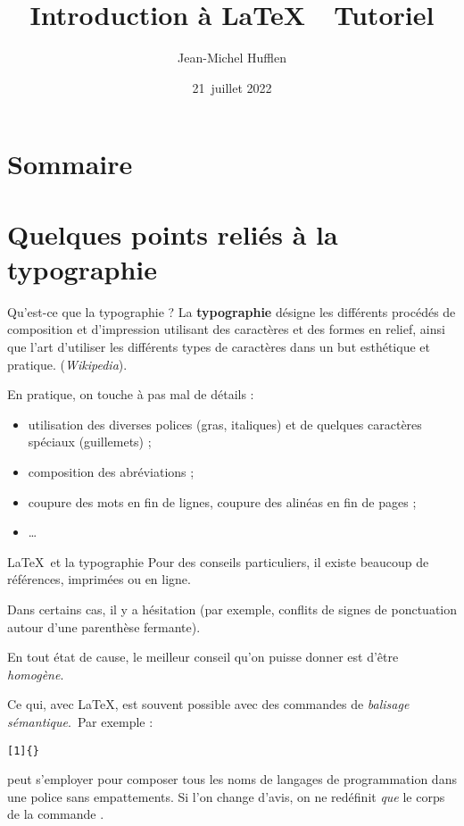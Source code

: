 \documentclass[pdf]{beamer}
\title{Introduction à \LaTeX\ \Dash\ Tutoriel}
\author{Jean-Michel Hufflen}
\date{21~juillet 2022}
\institute{TUG}
\begin{document}
\frame{\titlepage}

\section*{Sommaire}

\begin{frame}
\tableofcontents[]
\end{frame}

\section{Quelques points reliés à la typographie}

\begin{frame}{Qu'est-ce que la typographie ?}
La \textbf{typographie} désigne les différents procédés de composition et
d’impression utilisant des caractères et des formes en relief, ainsi que l’art
d’utiliser les différents types de caractères dans un but esthétique et
pratique. (\foreignlanguage{english}{\emph{Wikipedia}}).\pause

En pratique, on touche à pas mal de détails :\pause
\begin{itemize}
 \item utilisation des diverses polices (gras, italiques) et de quelques
caractères spéciaux (guillemets) ;\pause
 \item composition des abréviations ;\pause
 \item coupure des mots en fin de lignes, coupure des alinéas en fin de pages
;\pause
 \item \ldots
\end{itemize}
\end{frame}

\begin{frame}{\LaTeX\ et la typographie}
Pour des conseils particuliers, il existe beaucoup de références, imprimées ou
en ligne.\pause

Dans certains cas, il y a hésitation (par exemple, conflits de signes de
ponctuation autour d'une parenthèse fermante).\pause

En tout état de cause, le meilleur conseil qu'on puisse donner est d'être
\emph{homogène}.\pause

Ce qui, avec \LaTeX, est souvent possible avec des commandes de \emph{balisage
sémantique}.\pause\ Par exemple :
\begin{center}
\foreignlanguage{english}{\texttt{[1]\{\}}}
\end{center}
peut s'employer pour composer tous les noms de langages de programmation dans
une police sans empattements. Si l'on change d'avis, on ne redéfinit \emph{que}
le corps de la commande \foreignlanguage{english}{}.
\end{frame}
\end{document}
